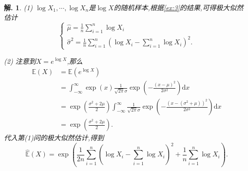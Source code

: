 \documentclass[a4paper,oneside,12pt]{ctexart}
\theoremstyle{plain}
\theoremstyle{nonumberplain}
\newtheorem{solution}{解.}
\theoremstyle{nonumberplain}
\newcommand{\dif}{\mathrm{d}}
\newcommand{\expect}{\mathbb{E}}
\begin{document}
    \begin{solution}
        (1) $\log X_1,\cdots,\log X_n$是$\log X$的随机样本,根据\cref{ex:3}的结果,可得极大似然估计 
        \begin{equation*}
            \begin{cases}
                \hat{\mu}=\frac{1}{n}\sum_{i=1}^n\log X_i\\
                \hat{\sigma}^2=\frac{1}{n}\sum_{i=1}^n\left(\log X_i-\sum_{i=1}^n\log X_i\right)^2.
            \end{cases}
        \end{equation*}

        (2) 注意到$X=e^{\log X}$,那么 
        \begin{align*}
            \expect(X)&=\expect(e^{\log X})\\
            &=\int_{-\infty}^\infty\exp(x)\frac{1}{\sqrt{2\pi}\sigma}\exp\left(-\frac{(x-\mu)^2}{2\sigma^2}\right)\dif x\\
            &=\exp\left(\frac{\sigma^2+2\mu}{2}\right)\int_{-\infty}^\infty\frac{1}{\sqrt{2\pi}\sigma}\exp\left(-\frac{(x-(\sigma^2+\mu))^2}{2\sigma^2}\right)\dif x\\
            &=\exp\left(\frac{\sigma^2+2\mu}{2}\right).
        \end{align*}
        代入第(1)问的极大似然估计,得到 
        \begin{equation*}
            \hat{\expect}(X)=\exp\left(\frac{1}{2n}\sum_{i=1}^n\left(\log X_i-\sum_{i=1}^n\log X_i\right)^2+\frac{1}{n}\sum_{i=1}^n\log X_i\right).
        \end{equation*}
    \end{solution}
\end{document}

